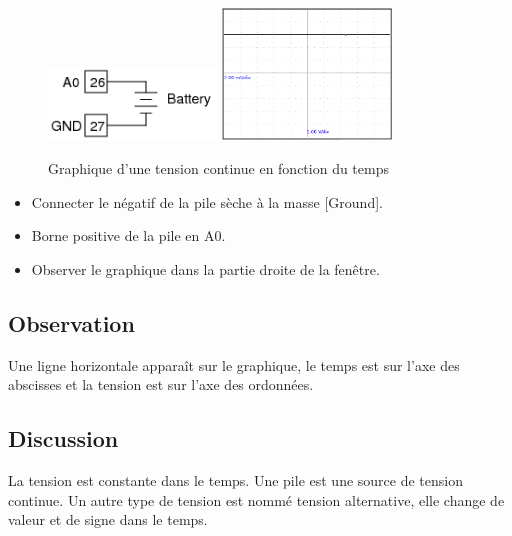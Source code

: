 \documentclass{book}
\begin{document}
\begin{figure}[h!]
\begin{center}
\caption{\label{fig:Graph-of-DC}Graphique d'une tension continue en fonction du temps }\vspace{0.5em}
\includegraphics[width=0.4\textwidth, height=0.3\textwidth, keepaspectratio]{Schematic-cell-voltage.png}
\includegraphics[width=0.4\textwidth, height=0.3\textwidth, keepaspectratio]{Pic-dcvoltage.png}
\end{center}
\end{figure}



\begin{itemize}
  \item Connecter le négatif de la pile sèche à la masse [Ground].
  \item Borne positive de la pile en A0.
  \item Observer le graphique dans la partie droite de la fenêtre.
\end{itemize}

\subsection{Observation}


Une ligne horizontale apparaît sur le graphique, le temps est sur l'axe des abscisses et la tension est sur l'axe des ordonnées.

\subsection{Discussion}


La tension est constante dans le temps. Une pile est une source de tension continue. Un autre type de tension est nommé tension alternative, elle change de valeur et de signe dans le temps.
\end{document}
